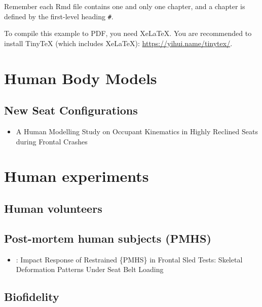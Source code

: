\documentclass[]{book}
\providecommand{\tightlist}{%
  \setlength{\itemsep}{0pt}\setlength{\parskip}{0pt}}
\begin{document}
Remember each Rmd file contains one and only one chapter, and a chapter is defined by the first-level heading \texttt{\#}.

To compile this example to PDF, you need XeLaTeX. You are recommended to install TinyTeX (which includes XeLaTeX): \url{https://yihui.name/tinytex/}.

\hypertarget{hbm}{%
\chapter{Human Body Models}\label{hbm}}

\hypertarget{new-seat-configurations-1}{%
\section{New Seat Configurations}\label{new-seat-configurations-1}}

\begin{itemize}
\tightlist
\item
  A Human Modelling Study on Occupant Kinematics in Highly Reclined Seats during Frontal Crashes \citep{Boyle2019}
\end{itemize}

\hypertarget{exp}{%
\chapter{Human experiments}\label{exp}}

\hypertarget{Vol}{%
\section{Human volunteers}\label{Vol}}

\hypertarget{PMHS}{%
\section{Post-mortem human subjects (PMHS)}\label{PMHS}}

\begin{itemize}
\tightlist
\item
  \citep{Shaw2009} : Impact Response of Restrained \{PMHS\} in Frontal Sled Tests: Skeletal Deformation Patterns Under Seat Belt Loading
\end{itemize}

\hypertarget{biofidelity-1}{%
\section{Biofidelity}\label{biofidelity-1}}
\end{document}
